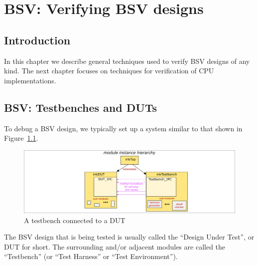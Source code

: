 

\chapter{BSV: Verifying BSV designs}


\setcounter{page}{1}
\renewcommand{\thepage}{\arabic{chapter}-\arabic{page}}

\label{ch_BSV_verification}


\section{Introduction}

In this chapter we describe general techniques used to verify BSV
designs of any kind.  The next chapter focuses on techniques for
verification of CPU implementations.


\section{BSV: Testbenches and DUTs}


To debug a BSV design, we typically set up a system similar to that
shown in Figure~\ref{Fig_Testbench_DUT}.
\begin{figure}[htbp]
  \centerline{\includegraphics[width=6in,angle=0]{Figures/Fig_Testbench_DUT}}
  \caption{\label{Fig_Testbench_DUT}
           A testbench connected to a DUT}
\end{figure}
The BSV design that is being tested is usually called the ``Design
Under Test'', or DUT for short.  The surrounding and/or adjacent
modules are called the ``Testbench'' (or ``Test Harness'' or ``Test
Environment'').

